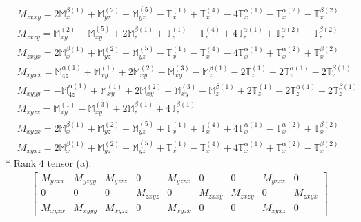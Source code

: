 \documentclass[fleqn,8pt,landscape]{jsarticle}
\begin{document}
\begin{align*}
& M_{zxxy} = 2 \mathbb{M}_{x}^{\beta(1)} + \mathbb{M}_{yz}^{(2)} - \mathbb{M}_{yz}^{(5)} - \mathbb{T}_{x}^{(1)} + \mathbb{T}_{x}^{(4)} - 4 \mathbb{T}_{x}^{\alpha(1)} - \mathbb{T}_{x}^{\alpha(2)} - \mathbb{T}_{x}^{\beta(2)} \\
& M_{zxzy} = \mathbb{M}_{xy}^{(2)} - \mathbb{M}_{xy}^{(5)} + 2 \mathbb{M}_{z}^{\beta(1)} + \mathbb{T}_{z}^{(1)} - \mathbb{T}_{z}^{(4)} + 4 \mathbb{T}_{z}^{\alpha(1)} + \mathbb{T}_{z}^{\alpha(2)} - \mathbb{T}_{z}^{\beta(2)} \\
& M_{zxyx} = 2 \mathbb{M}_{x}^{\beta(1)} + \mathbb{M}_{yz}^{(2)} + \mathbb{M}_{yz}^{(5)} - \mathbb{T}_{x}^{(1)} - \mathbb{T}_{x}^{(4)} - 4 \mathbb{T}_{x}^{\alpha(1)} + \mathbb{T}_{x}^{\alpha(2)} + \mathbb{T}_{x}^{\beta(2)} \\
& M_{xyxx} = \mathbb{M}_{4z}^{\alpha(1)} + \mathbb{M}_{xy}^{(1)} + 2 \mathbb{M}_{xy}^{(2)} - \mathbb{M}_{xy}^{(3)} - \mathbb{M}_{z}^{\beta(1)} - 2 \mathbb{T}_{z}^{(1)} + 2 \mathbb{T}_{z}^{\alpha(1)} - 2 \mathbb{T}_{z}^{\beta(1)} \\
& M_{xyyy} = - \mathbb{M}_{4z}^{\alpha(1)} + \mathbb{M}_{xy}^{(1)} + 2 \mathbb{M}_{xy}^{(2)} - \mathbb{M}_{xy}^{(3)} - \mathbb{M}_{z}^{\beta(1)} + 2 \mathbb{T}_{z}^{(1)} - 2 \mathbb{T}_{z}^{\alpha(1)} - 2 \mathbb{T}_{z}^{\beta(1)} \\
& M_{xyzz} = \mathbb{M}_{xy}^{(1)} - \mathbb{M}_{xy}^{(3)} + 2 \mathbb{M}_{z}^{\beta(1)} + 4 \mathbb{T}_{z}^{\beta(1)} \\
& M_{xyzx} = 2 \mathbb{M}_{x}^{\beta(1)} + \mathbb{M}_{yz}^{(2)} + \mathbb{M}_{yz}^{(5)} + \mathbb{T}_{x}^{(1)} + \mathbb{T}_{x}^{(4)} + 4 \mathbb{T}_{x}^{\alpha(1)} - \mathbb{T}_{x}^{\alpha(2)} + \mathbb{T}_{x}^{\beta(2)} \\
& M_{xyxz} = 2 \mathbb{M}_{x}^{\beta(1)} + \mathbb{M}_{yz}^{(2)} - \mathbb{M}_{yz}^{(5)} + \mathbb{T}_{x}^{(1)} - \mathbb{T}_{x}^{(4)} + 4 \mathbb{T}_{x}^{\alpha(1)} + \mathbb{T}_{x}^{\alpha(2)} - \mathbb{T}_{x}^{\beta(2)}
\end{align*}
* Rank 4 tensor (a).
\begin{align*}
\begin{bmatrix} M_{yzxx} & M_{yzyy} & M_{yzzz} & 0 & M_{yzzx} & 0 & 0 & M_{yzxz} & 0 \\ 0 & 0 & 0 & M_{zxyz} & 0 & M_{zxxy} & M_{zxzy} & 0 & M_{zxyx} \\ M_{xyxx} & M_{xyyy} & M_{xyzz} & 0 & M_{xyzx} & 0 & 0 & M_{xyxz} & 0 \end{bmatrix}
\end{align*}
\end{document}
